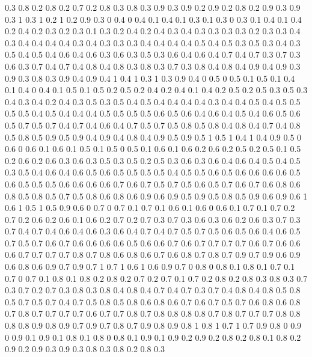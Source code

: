 0.3 0.8
0.2 0.8
0.2 0.7
0.2 0.8
0.3 0.8
0.3 0.9
0.3 0.9
0.2 0.9
0.2 0.8
0.2 0.9
0.3 0.9
0.3 1
0.3 1
0.2 1
0.2 0.9
0.3 0
0.4 0
0.4 0.1
0.4 0.1
0.3 0.1
0.3 0
0.3 0.1
0.4 0.1
0.4 0.2
0.4 0.2
0.3 0.2
0.3 0.1
0.3 0.2
0.4 0.2
0.4 0.3
0.4 0.3
0.3 0.3
0.3 0.2
0.3 0.3
0.4 0.3
0.4 0.4
0.4 0.4
0.3 0.4
0.3 0.3
0.3 0.4
0.4 0.4
0.4 0.5
0.4 0.5
0.3 0.5
0.3 0.4
0.3 0.5
0.4 0.5
0.4 0.6
0.4 0.6
0.3 0.6
0.3 0.5
0.3 0.6
0.4 0.6
0.4 0.7
0.4 0.7
0.3 0.7
0.3 0.6
0.3 0.7
0.4 0.7
0.4 0.8
0.4 0.8
0.3 0.8
0.3 0.7
0.3 0.8
0.4 0.8
0.4 0.9
0.4 0.9
0.3 0.9
0.3 0.8
0.3 0.9
0.4 0.9
0.4 1
0.4 1
0.3 1
0.3 0.9
0.4 0
0.5 0
0.5 0.1
0.5 0.1
0.4 0.1
0.4 0
0.4 0.1
0.5 0.1
0.5 0.2
0.5 0.2
0.4 0.2
0.4 0.1
0.4 0.2
0.5 0.2
0.5 0.3
0.5 0.3
0.4 0.3
0.4 0.2
0.4 0.3
0.5 0.3
0.5 0.4
0.5 0.4
0.4 0.4
0.4 0.3
0.4 0.4
0.5 0.4
0.5 0.5
0.5 0.5
0.4 0.5
0.4 0.4
0.4 0.5
0.5 0.5
0.5 0.6
0.5 0.6
0.4 0.6
0.4 0.5
0.4 0.6
0.5 0.6
0.5 0.7
0.5 0.7
0.4 0.7
0.4 0.6
0.4 0.7
0.5 0.7
0.5 0.8
0.5 0.8
0.4 0.8
0.4 0.7
0.4 0.8
0.5 0.8
0.5 0.9
0.5 0.9
0.4 0.9
0.4 0.8
0.4 0.9
0.5 0.9
0.5 1
0.5 1
0.4 1
0.4 0.9
0.5 0
0.6 0
0.6 0.1
0.6 0.1
0.5 0.1
0.5 0
0.5 0.1
0.6 0.1
0.6 0.2
0.6 0.2
0.5 0.2
0.5 0.1
0.5 0.2
0.6 0.2
0.6 0.3
0.6 0.3
0.5 0.3
0.5 0.2
0.5 0.3
0.6 0.3
0.6 0.4
0.6 0.4
0.5 0.4
0.5 0.3
0.5 0.4
0.6 0.4
0.6 0.5
0.6 0.5
0.5 0.5
0.5 0.4
0.5 0.5
0.6 0.5
0.6 0.6
0.6 0.6
0.5 0.6
0.5 0.5
0.5 0.6
0.6 0.6
0.6 0.7
0.6 0.7
0.5 0.7
0.5 0.6
0.5 0.7
0.6 0.7
0.6 0.8
0.6 0.8
0.5 0.8
0.5 0.7
0.5 0.8
0.6 0.8
0.6 0.9
0.6 0.9
0.5 0.9
0.5 0.8
0.5 0.9
0.6 0.9
0.6 1
0.6 1
0.5 1
0.5 0.9
0.6 0
0.7 0
0.7 0.1
0.7 0.1
0.6 0.1
0.6 0
0.6 0.1
0.7 0.1
0.7 0.2
0.7 0.2
0.6 0.2
0.6 0.1
0.6 0.2
0.7 0.2
0.7 0.3
0.7 0.3
0.6 0.3
0.6 0.2
0.6 0.3
0.7 0.3
0.7 0.4
0.7 0.4
0.6 0.4
0.6 0.3
0.6 0.4
0.7 0.4
0.7 0.5
0.7 0.5
0.6 0.5
0.6 0.4
0.6 0.5
0.7 0.5
0.7 0.6
0.7 0.6
0.6 0.6
0.6 0.5
0.6 0.6
0.7 0.6
0.7 0.7
0.7 0.7
0.6 0.7
0.6 0.6
0.6 0.7
0.7 0.7
0.7 0.8
0.7 0.8
0.6 0.8
0.6 0.7
0.6 0.8
0.7 0.8
0.7 0.9
0.7 0.9
0.6 0.9
0.6 0.8
0.6 0.9
0.7 0.9
0.7 1
0.7 1
0.6 1
0.6 0.9
0.7 0
0.8 0
0.8 0.1
0.8 0.1
0.7 0.1
0.7 0
0.7 0.1
0.8 0.1
0.8 0.2
0.8 0.2
0.7 0.2
0.7 0.1
0.7 0.2
0.8 0.2
0.8 0.3
0.8 0.3
0.7 0.3
0.7 0.2
0.7 0.3
0.8 0.3
0.8 0.4
0.8 0.4
0.7 0.4
0.7 0.3
0.7 0.4
0.8 0.4
0.8 0.5
0.8 0.5
0.7 0.5
0.7 0.4
0.7 0.5
0.8 0.5
0.8 0.6
0.8 0.6
0.7 0.6
0.7 0.5
0.7 0.6
0.8 0.6
0.8 0.7
0.8 0.7
0.7 0.7
0.7 0.6
0.7 0.7
0.8 0.7
0.8 0.8
0.8 0.8
0.7 0.8
0.7 0.7
0.7 0.8
0.8 0.8
0.8 0.9
0.8 0.9
0.7 0.9
0.7 0.8
0.7 0.9
0.8 0.9
0.8 1
0.8 1
0.7 1
0.7 0.9
0.8 0
0.9 0
0.9 0.1
0.9 0.1
0.8 0.1
0.8 0
0.8 0.1
0.9 0.1
0.9 0.2
0.9 0.2
0.8 0.2
0.8 0.1
0.8 0.2
0.9 0.2
0.9 0.3
0.9 0.3
0.8 0.3
0.8 0.2
0.8 0.3

